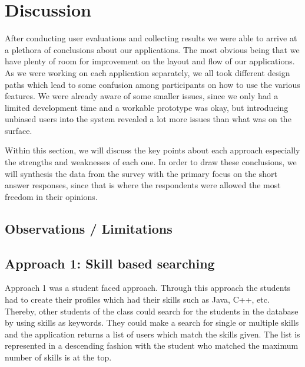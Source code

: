 \documentclass[conference]{IEEEtran}
\begin{document}
\section{Discussion}
After conducting user evaluations and collecting results we were able to arrive at a plethora of conclusions about our applications. The most obvious being that we have plenty of room for improvement on the layout and flow of our applications. As we were working on each application separately, we all took different design paths which lead to some confusion among participants on how to use the various features. We were already aware of some smaller issues, since we only had a limited development time and a workable prototype was okay, but introducing unbiased users into the system revealed a lot more issues than what was on the surface. 

Within this section, we will discuss the key points about each approach especially the strengths and weaknesses of each one. In order to draw these conclusions, we will synthesis the data from the survey with the primary focus on the short answer responses, since that is where the respondents were allowed the most freedom in their opinions. 

\subsection{Observations / Limitations}

\subsection{Approach 1: Skill based searching}
Approach 1 was a student faced approach. Through this approach the students had to create their profiles which had their skills such as Java, C++, etc. Thereby, other students of the class could search for the students in the database by using skills as keywords. They could make a search for single or multiple skills and the application returns a list of users which match the skills given. The list is represented in a descending fashion with the student who matched the maximum number of skills is at the top.
\end{document}
